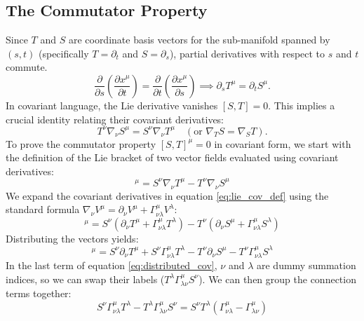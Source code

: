 \documentclass[11pt, a4paper]{report}
\begin{document}
\subsection*{The Commutator Property}
Since \(T\) and \(S\) are coordinate basis vectors for the sub-manifold spanned by \((s, t)\) (specifically \(T = \partial_t\) and \(S = \partial_s\)), partial derivatives with respect to \(s\) and \(t\) commute.
\begin{equation}
\frac{\partial}{\partial s} \left( \frac{\partial x^\mu}{\partial t} \right) = \frac{\partial}{\partial t} \left( \frac{\partial x^\mu}{\partial s} \right) \implies \partial_s T^\mu = \partial_t S^\mu.
\end{equation}
In covariant language, the Lie derivative vanishes \([S, T] = 0\). This implies a crucial identity relating their covariant derivatives:
\begin{equation}
\label{eq:commutator_ST}
T^\nu \nabla_\nu S^\mu = S^\nu \nabla_\nu T^\mu \quad (\text{or } \nabla_T S = \nabla_S T).
\end{equation}
To prove the commutator property $[S,T]^\mu = 0$ in covariant form, we start with the definition of the Lie bracket of two vector fields evaluated using covariant derivatives:
\begin{equation} [S,T]^\mu = S^\nu \nabla_\nu T^\mu - T^\nu \nabla_\nu S^\mu \label{eq:lie_cov_def} \end{equation}
We expand the covariant derivatives in equation \eqref{eq:lie_cov_def} using the standard formula $\nabla_\nu V^\mu = \partial_\nu V^\mu + \Gamma^\mu_{\nu\lambda} V^\lambda$:
\begin{equation} [S,T]^\mu = S^\nu (\partial_\nu T^\mu + \Gamma^\mu_{\nu\lambda} T^\lambda) - T^\nu (\partial_\nu S^\mu + \Gamma^\mu_{\nu\lambda} S^\lambda) \label{eq:expanded_cov} \end{equation}
Distributing the vectors yields:
\begin{equation} [S,T]^\mu = S^\nu \partial_\nu T^\mu + S^\nu \Gamma^\mu_{\nu\lambda} T^\lambda - T^\nu \partial_\nu S^\mu - T^\nu \Gamma^\mu_{\nu\lambda} S^\lambda \label{eq:distributed_cov} \end{equation}
In the last term of equation \eqref{eq:distributed_cov}, $\nu$ and $\lambda$ are dummy summation indices, so we can swap their labels ($T^\lambda \Gamma^\mu_{\lambda\nu} S^\nu$). We can then group the connection terms together:
\begin{equation} S^\nu \Gamma^\mu_{\nu\lambda} T^\lambda - T^\lambda \Gamma^\mu_{\lambda\nu} S^\nu = S^\nu T^\lambda (\Gamma^\mu_{\nu\lambda} - \Gamma^\mu_{\lambda\nu}) \label{eq:gamma_grouping} \end{equation}
\end{document}
